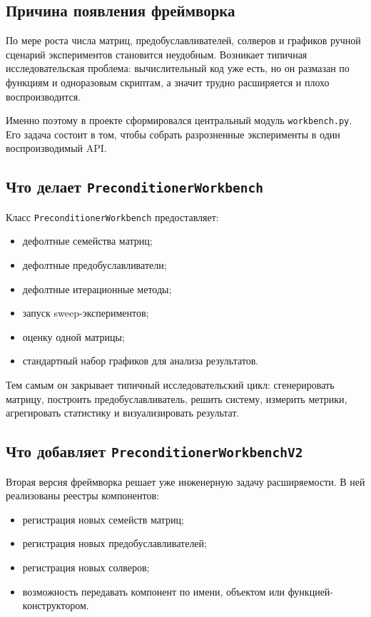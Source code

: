 \documentclass[12pt,a4paper]{article}
\begin{document}
\subsection{Причина появления фреймворка}

По мере роста числа матриц, предобуславливателей, солверов и графиков ручной сценарий экспериментов становится неудобным. Возникает типичная исследовательская проблема: вычислительный код уже есть, но он размазан по функциям и одноразовым скриптам, а значит трудно расширяется и плохо воспроизводится.

Именно поэтому в проекте сформировался центральный модуль \texttt{workbench.py}. Его задача состоит в том, чтобы собрать разрозненные эксперименты в один воспроизводимый API.

\subsection{Что делает \texttt{PreconditionerWorkbench}}

Класс \texttt{PreconditionerWorkbench} предоставляет:
\begin{itemize}[leftmargin=*]
    \item дефолтные семейства матриц;
    \item дефолтные предобуславливатели;
    \item дефолтные итерационные методы;
    \item запуск sweep-экспериментов;
    \item оценку одной матрицы;
    \item стандартный набор графиков для анализа результатов.
\end{itemize}

Тем самым он закрывает типичный исследовательский цикл: сгенерировать матрицу, построить предобуславливатель, решить систему, измерить метрики, агрегировать статистику и визуализировать результат.

\subsection{Что добавляет \texttt{PreconditionerWorkbenchV2}}

Вторая версия фреймворка решает уже инженерную задачу расширяемости. В ней реализованы реестры компонентов:
\begin{itemize}[leftmargin=*]
    \item регистрация новых семейств матриц;
    \item регистрация новых предобуславливателей;
    \item регистрация новых солверов;
    \item возможность передавать компонент по имени, объектом или функцией-конструктором.
\end{itemize}
\end{document}

